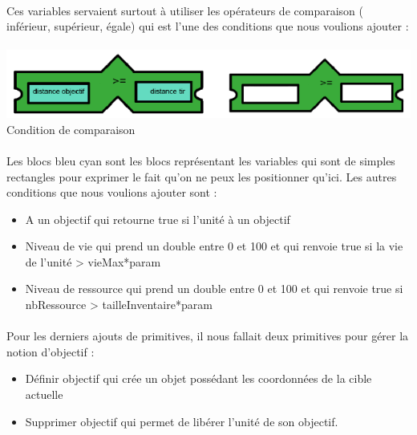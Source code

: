 \documentclass{report}
\begin{document}
\paragraph{}
  Ces variables servaient surtout à utiliser les opérateurs de comparaison ( inférieur, supérieur, égale) qui est l’une des conditions que nous voulions ajouter : 

\paragraph{}
\begin{adjustwidth}{-8em}{}
\includegraphics[scale=1]{DATA/comparaison.png}
 {Condition de comparaison}
\end{adjustwidth}
\paragraph{}

Les blocs bleu cyan sont les blocs représentant les variables qui sont de simples rectangles pour exprimer le fait qu’on ne peux les positionner qu’ici. \newline
Les autres conditions que nous voulions ajouter sont :
\begin{itemize}
\item A un objectif qui retourne true si l’unité à un objectif
\item Niveau de vie qui prend un double entre 0 et 100 et qui renvoie true si la vie de l’unité > vieMax*param
\item Niveau de ressource qui prend un double entre 0 et 100 et qui renvoie true si nbRessource > tailleInventaire*param
\end{itemize}
\paragraph{}
  Pour les derniers ajouts de primitives, il nous fallait deux primitives pour gérer la notion d’objectif :
  \begin{itemize}
\item Définir objectif qui crée un objet possédant les coordonnées de la cible actuelle
\item Supprimer objectif qui permet de libérer l’unité de son objectif.
\end{itemize}
\end{document}
